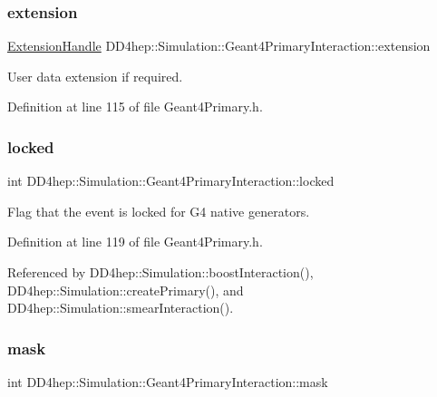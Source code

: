 \subsubsection{\texorpdfstring{extension}{extension}}
{\footnotesize\ttfamily \hyperlink{class_d_d4hep_1_1_simulation_1_1_geant4_primary_interaction_a9d53c6c8fa2e7a6094ba91854af945f4}{Extension\+Handle} D\+D4hep\+::\+Simulation\+::\+Geant4\+Primary\+Interaction\+::extension}



User data extension if required. 



Definition at line 115 of file Geant4\+Primary.\+h.

\hypertarget{class_d_d4hep_1_1_simulation_1_1_geant4_primary_interaction_a29b9944b1c56dbbc422320f6bc5a3a85}{}\label{class_d_d4hep_1_1_simulation_1_1_geant4_primary_interaction_a29b9944b1c56dbbc422320f6bc5a3a85} 
\subsubsection{\texorpdfstring{locked}{locked}}
{\footnotesize\ttfamily int D\+D4hep\+::\+Simulation\+::\+Geant4\+Primary\+Interaction\+::locked}



Flag that the event is locked for G4 native generators. 



Definition at line 119 of file Geant4\+Primary.\+h.



Referenced by D\+D4hep\+::\+Simulation\+::boost\+Interaction(), D\+D4hep\+::\+Simulation\+::create\+Primary(), and D\+D4hep\+::\+Simulation\+::smear\+Interaction().

\hypertarget{class_d_d4hep_1_1_simulation_1_1_geant4_primary_interaction_a0b4d8c22740846c3d812a13c1048b594}{}\label{class_d_d4hep_1_1_simulation_1_1_geant4_primary_interaction_a0b4d8c22740846c3d812a13c1048b594} 
\subsubsection{\texorpdfstring{mask}{mask}}
{\footnotesize\ttfamily int D\+D4hep\+::\+Simulation\+::\+Geant4\+Primary\+Interaction\+::mask}



